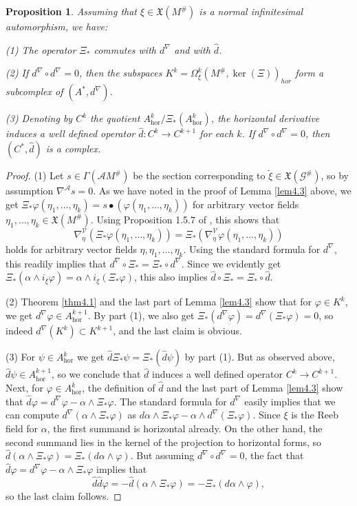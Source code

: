 \documentclass[12pt,a4paper]{amsart}
\def\frak{\mathfrak}
\def\Cal{\mathcal}
\let\phi\varphi
\renewcommand{\o}{\circ}
\newcommand{\al}{\alpha}
\newcommand{\ph}{\phi}
\newcommand{\ps}{\psi}
\newcommand{\Ga}{\Gamma}
\newcommand{\Om}{\Omega}
\newcommand{\hor}{\text{hor}}
\newcounter{theorem}
\numberwithin{theorem}{section}
\newtheorem{prop}[theorem]{Proposition}
\theoremstyle{definition}
\theoremstyle{remark}
\begin{document}
\begin{prop}\label{prop4.3}
  Assuming that $\xi\in\frak X(M^\#)$ is a normal infinitesimal
  automorphism, we have:

  (1) The operator $\Xi_*$ commutes with $d^\nabla$ and with $\hat d$.

  (2) If $d^{\nabla}\o d^\nabla=0$, then the subspaces
  $K^k=\Om^k_\xi(M^\#,\ker(\Xi))_{hor}$ form a subcomplex of
  $(A^*,d^\nabla)$.

  (3) Denoting by $C^k$ the quotient $A^k_\hor/\Xi_*(A^k_\hor)$, the
  horizontal derivative induces a well defined operator $\hat d:C^k\to
  C^{k+1}$ for each $k$. If $d^{\nabla}\o d^\nabla=0$, then $(C^*,\hat
  d)$ is a complex.
\end{prop}
\begin{proof}
  (1) Let $s\in\Ga(\Cal AM^\#)$ be the section corresponding to
  $\tilde\xi\in\frak X(\Cal G^\#)$, so by assumption $\nabla^{\Cal
    A}s=0$. As we have noted in the proof of Lemma \ref{lem4.3} above, we
  get $\Xi_*\ph(\eta_1,\dots,\eta_k)=s\bullet
  (\ph(\eta_1,\dots,\eta_k))$ for arbitrary vector fields
  $\eta_1,\dots,\eta_k\in\frak X(M^\#)$. Using Proposition 1.5.7 of
  \cite{book}, this shows that
  $$
  \nabla_\eta^{\Cal
    V}(\Xi_*\ph(\eta_1,\dots,\eta_k))=\Xi_*(\nabla_\eta^{\Cal
    V}\ph(\eta_1,\dots,\eta_k))
$$
holds for arbitrary vector fields $\eta,\eta_1,\dots,\eta_k$. Using
the standard formula for $d^\nabla$, this readily implies that
$d^\nabla\o\Xi_*=\Xi_*\o d^\nabla$. Since we evidently get
$\Xi_*(\alpha\wedge i_\xi\ph)=\alpha\wedge i_\xi(\Xi_*\ph)$, this also
implies $\hat d\o\Xi_*=\Xi_*\o \hat d$.

(2) Theorem \ref{thm4.1} and the last part of Lemma \ref{lem4.3} show that
for $\ph\in K^k$, we get $d^\nabla\ph\in A^{k+1}_\hor$. By part (1),
we also get $\Xi_*(d^\nabla\ph)=d^\nabla(\Xi_*\ph)=0$, so indeed
$d^\nabla(K^k)\subset K^{k+1}$, and the last claim is obvious.

(3) For $\ps\in A^k_\hor$ we get $\hat d\Xi_*\ps=\Xi_*(\hat d\ps)$ by
part (1). But as observed above, $\hat d\ps\in A^{k+1}_\hor$, so we
conclude that $\hat d$ induces a well defined operator $C^k\to
C^{k+1}$. Next, for $\ph\in A^k_\hor$, the definition of $\hat d$ and
the last part of Lemma \ref{lem4.3} show that $\hat
d\ph=d^\nabla\ph-\al\wedge\Xi_*\ph$. The standard formula for
$d^\nabla$ easily implies that we can compute
$d^{\nabla}(\al\wedge\Xi_*\ph)$ as $d\al\wedge \Xi_*\ph-\al\wedge
d^\nabla(\Xi_*\ph)$. Since $\xi$ is the Reeb field for $\al$, the
first summand is horizontal already. On the other hand, the second
summand lies in the kernel of the projection to horizontal
forms, so $\hat d(\al\wedge\Xi_*\ph)=\Xi_*(d\al\wedge\ph)$. But
assuming $d^\nabla\o d^\nabla=0$, the fact that $\hat
d\ph=d^\nabla\ph-\al\wedge\Xi_*\ph$ implies that 
$$
\hat d\hat d\ph=-\hat d(\al\wedge\Xi_*\ph)=-\Xi_*(d\al\wedge\ph),
$$
so the last claim follows. 
\end{proof}
\end{document}
